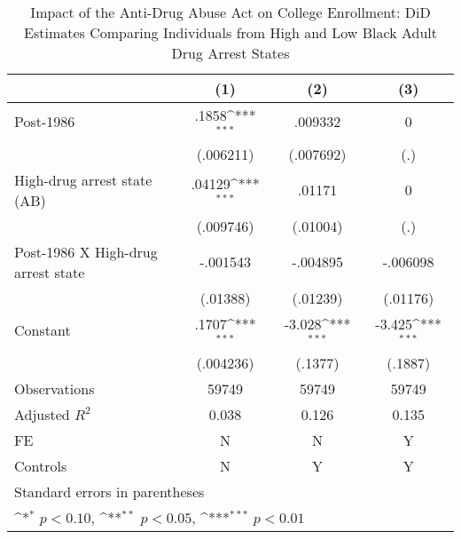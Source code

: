 \begin{table}[htbp]\centering
\def\sym#1{\ifmmode^{#1}\else\(^{#1}\)\fi}
\caption{Impact of the Anti-Drug Abuse Act on College Enrollment: DiD Estimates Comparing Individuals from High and Low Black Adult Drug Arrest States}
\begin{tabular}{l*{3}{c}}
\hline\hline
                    &\multicolumn{1}{c}{(1)}         &\multicolumn{1}{c}{(2)}         &\multicolumn{1}{c}{(3)}         \\
\hline
Post-1986           &       .1858\sym{***}&     .009332         &           0         \\
                    &   (.006211)         &   (.007692)         &         (.)         \\
[1em]
High-drug arrest state (AB)&      .04129\sym{***}&      .01171         &           0         \\
                    &   (.009746)         &    (.01004)         &         (.)         \\
[1em]
Post-1986 X High-drug arrest state&    -.001543         &    -.004895         &    -.006098         \\
                    &    (.01388)         &    (.01239)         &    (.01176)         \\
[1em]
Constant            &       .1707\sym{***}&      -3.028\sym{***}&      -3.425\sym{***}\\
                    &   (.004236)         &     (.1377)         &     (.1887)         \\
\hline
Observations        &       59749         &       59749         &       59749         \\
Adjusted \(R^{2}\)  &       0.038         &       0.126         &       0.135         \\
FE                  &           N         &           N         &           Y         \\
Controls            &           N         &           Y         &           Y         \\
\hline\hline
\multicolumn{4}{l}{\footnotesize Standard errors in parentheses}\\
\multicolumn{4}{l}{\footnotesize \sym{*} \(p<0.10\), \sym{**} \(p<0.05\), \sym{***} \(p<0.01\)}\\
\end{tabular}
\end{table}
